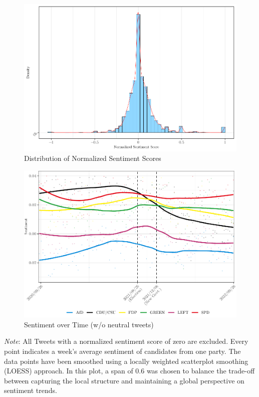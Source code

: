 \documentclass[a4paper,11pt]{article}
\begin{document}
\begin{figure}[H]

\includegraphics[width=0.95\linewidth]{thesis_files/figure-latex/sentimenthist-1} \hfill{}

\caption{Distribution of Normalized Sentiment Scores}\label{fig:sentimenthist}
\end{figure}
\newpage
\begin{figure}[H]

{\centering \includegraphics[width=1\linewidth]{thesis_files/figure-latex/plotsentimentweeklyappendix-1} 

}

\caption{Sentiment over Time (w/o neutral tweets)}\label{fig:plotsentimentweeklyappendix}
\end{figure}
\vspace{-0.2cm}
\begin{center}
    \begin{minipage}{\linewidth}
    \scriptsize
    \textit{Note}: All Tweets with a normalized sentiment score of zero are excluded.
    Every point indicates a week's average sentiment of candidates from one party.
    The data points have been smoothed using a locally weighted scatterplot smoothing (LOESS) approach. In this plot,
    a span of 0.6 was chosen to balance the trade-off between capturing the local structure and maintaining a global perspective on
    sentiment trends. 
    \end{minipage}
\end{center}
\end{document}
